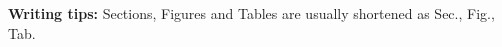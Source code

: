 \noindent \textbf{Writing tips:} Sections, Figures and Tables are usually shortened as Sec., Fig., Tab. 
\begin{itemize}
\end{itemize}

